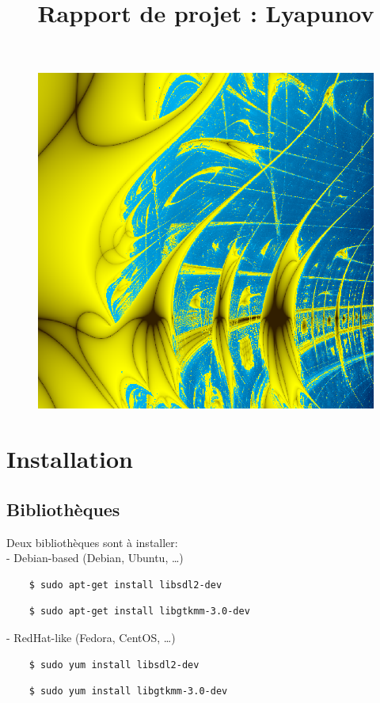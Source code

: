 \documentclass{article}
\title{Rapport de projet : Lyapunov}
\date{}
\begin{document}
	\vspace*{-2pt}
	{\let\newpage\relax\maketitle} \thispagestyle{fancy}
	\vspace{-2cm}
	\begin{figure}[!h]
		\centering
		\includegraphics[scale=0.3]{zircon}
	\end{figure}
	\tableofcontents

	\section{Installation}
	\subsection{Bibliothèques}
	\noindent Deux bibliothèques sont à installer:\\
	- Debian-based (Debian, Ubuntu, \ldots)
	\begin{lstlisting}
	$ sudo apt-get install libsdl2-dev
	\end{lstlisting}
	\begin{lstlisting}
	$ sudo apt-get install libgtkmm-3.0-dev
	\end{lstlisting}
	- RedHat-like (Fedora, CentOS, \ldots)
	\begin{lstlisting}
	$ sudo yum install libsdl2-dev
	\end{lstlisting}
	\begin{lstlisting}
	$ sudo yum install libgtkmm-3.0-dev
	\end{lstlisting}
\end{document}
